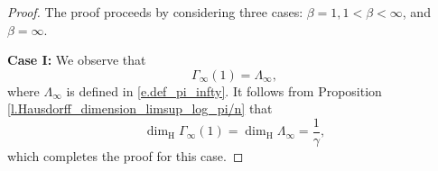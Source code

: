 \documentclass[12pt,reqno]{amsart}
\renewcommand{\=}{\coloneqq}
\theoremstyle{plain}
\begin{document}
  \begin{proof}
  The proof proceeds by considering three cases: $\beta=1, 1<\beta <\infty$, and $\beta =\infty$.

\textbf{Case I: } We observe that
\begin{equation*}
            {\Gamma}_{\infty}(1) = \Lambda_{\infty},
        \end{equation*}
        where $\Lambda_{\infty}$ is defined in \eqref{e.def_pi_infty}. It follows from Proposition \ref{l.Hausdorff_dimension_limsup_log_pi/n} that
        \begin{equation}\label{e.dim_Gamma<1/2}
                \dim_{\mathrm{H}}{\Gamma}_{\infty}(1)=\dim_{\mathrm{H}}\Lambda_{\infty}
                =\frac{1}{\gamma},
        \end{equation}
        which completes the proof for this case.



\end{proof}
\end{document}
